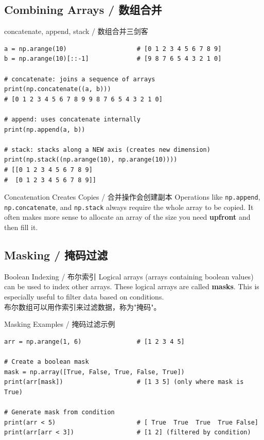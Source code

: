 \documentclass[11pt,a4paper]{article}
\begin{document}
\subsection{Combining Arrays / 数组合并}

\begin{examplebox}{concatenate, append, stack / 数组合并三剑客}
\begin{lstlisting}
a = np.arange(10)                   # [0 1 2 3 4 5 6 7 8 9]
b = np.arange(10)[::-1]             # [9 8 7 6 5 4 3 2 1 0]

# concatenate: joins a sequence of arrays
print(np.concatenate((a, b)))
# [0 1 2 3 4 5 6 7 8 9 9 8 7 6 5 4 3 2 1 0]

# append: uses concatenate internally
print(np.append(a, b))

# stack: stacks along a NEW axis (creates new dimension)
print(np.stack((np.arange(10), np.arange(10))))
# [[0 1 2 3 4 5 6 7 8 9]
#  [0 1 2 3 4 5 6 7 8 9]]
\end{lstlisting}
\end{examplebox}

\begin{warning}{Concatenation Creates Copies / 合并操作会创建副本}
    Operations like \texttt{np.append}, \texttt{np.concatenate}, and \texttt{np.stack} always require the whole array to be copied. It often makes more sense to allocate an array of the size you need \textbf{upfront} and then fill it.
\end{warning}

\subsection{Masking / 掩码过滤}

\begin{concept}{Boolean Indexing / 布尔索引}
    Logical arrays (arrays containing boolean values) can be used to index other arrays. These logical arrays are called \textbf{masks}. This is especially useful to filter data based on conditions. \\
    布尔数组可以用作索引来过滤数据，称为"掩码"。
\end{concept}

\begin{examplebox}{Masking Examples / 掩码过滤示例}
\begin{lstlisting}
arr = np.arange(1, 6)               # [1 2 3 4 5]

# Create a boolean mask
mask = np.array([True, False, True, False, True])
print(arr[mask])                    # [1 3 5] (only where mask is True)

# Generate mask from condition
print(arr < 5)                      # [ True  True  True  True False]
print(arr[arr < 3])                 # [1 2] (filtered by condition)
\end{lstlisting}
\end{examplebox}
\end{document}
